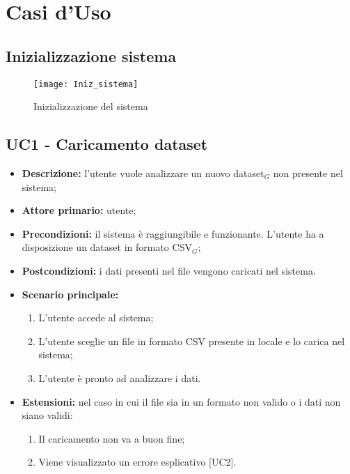 \chapter{Casi d'Uso}
\section*{Inizializzazione sistema}

\begin{figure}[ht]
  \centering
  \texttt{[image: Iniz\_sistema]}
  \caption{Inizializzazione del sistema}
\end{figure}
\section{UC1 - Caricamento dataset}
\begin{itemize}
  \item \textbf{Descrizione:} l'utente vuole analizzare un nuovo dataset$_G$ non presente nel sistema;
  \item \textbf{Attore primario:} utente;
  \item \textbf{Precondizioni:} il sistema è raggiungibile e funzionante. L’utente ha a disposizione un dataset in formato CSV$_G$;
  \item \textbf{Postcondizioni:} i dati presenti nel file vengono caricati nel sistema.
  \item \textbf{Scenario principale:}
  \begin{enumerate}
    \item L'utente accede al sistema;
    \item L'utente sceglie un file in formato CSV presente in locale e lo carica nel sistema;
    \item L'utente è pronto ad analizzare i dati.
  \end{enumerate}
  \item \textbf{Estensioni:} nel caso in cui il file sia in un formato non valido o i dati non siano validi:
    \begin{enumerate}
      \item Il caricamento non va a buon fine;
      \item Viene visualizzato un errore esplicativo [UC2].
    \end{enumerate}
\end{itemize}

